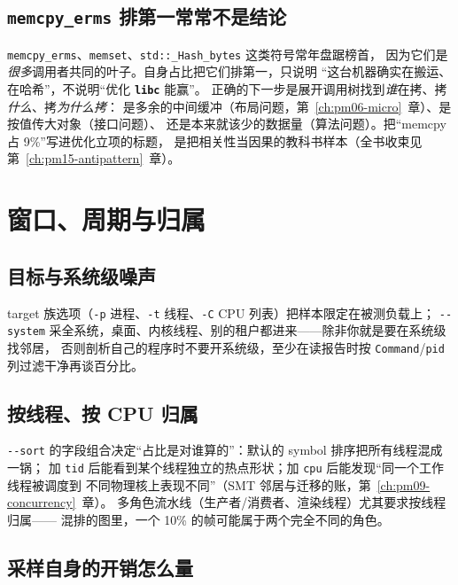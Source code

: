 \documentclass[12pt,a4paper,fontset=fandol]{ctexbook}
\newcommand{\Tp}[1]{\texttt{#1}}
\newcommand{\Opt}[1]{\texttt{-\/-#1}}
\newcommand{\Bk}{\discretionary{}{}{}}
\newcommand{\Lib}[1]{\textbf{\texttt{#1}}}
\begin{document}
\subsection{\Tp{memcpy\_erms} 排第一常常不是结论}

\begin{warning}[title={库顶帧效应：别和 \Lib{libc} 吵架}]
\Tp{memcpy\_erms}、\Tp{memset}、\Tp{std::{\Bk}\_Hash{\Bk}\_bytes} 这类符号常年盘踞榜首，
因为它们是\emph{很多}调用者共同的叶子。自身占比把它们排第一，只说明
``这台机器确实在搬运、在哈希''，不说明``优化 \Lib{libc} 能赢''。
正确的下一步是展开调用树找到\emph{谁}在拷、拷\emph{什么}、拷\emph{为什么拷}：
是多余的中间缓冲（布局问题，第~\ref{ch:pm06-micro}~章）、是按值传大对象（接口问题）、
还是本来就该少的数据量（算法问题）。把``memcpy 占 9\%''写进优化立项的标题，
是把相关性当因果的教科书样本（全书收束见第~\ref{ch:pm15-antipattern}~章）。
\end{warning}

\section{窗口、周期与归属}
\label{sec:pm04-window}

\subsection{目标与系统级噪声}

target 族选项（\Tp{-p} 进程、\Tp{-t} 线程、\Tp{-C} CPU 列表）把样本限定在被测负载上；
\Opt{system} 采全系统，桌面、内核线程、别的租户都进来——除非你就是要在系统级找邻居，
否则剖析自己的程序时不要开系统级，至少在读报告时按 \Tp{Command}/\Tp{pid} 列过滤干净再谈百分比。

\subsection{按线程、按 CPU 归属}

\Opt{sort} 的字段组合决定``占比是对谁算的''：默认的 symbol 排序把所有线程混成一锅；
加 \Tp{tid} 后能看到某个线程独立的热点形状；加 \Tp{cpu} 后能发现``同一个工作线程被调度到
不同物理核上表现不同''（SMT 邻居与迁移的账，第~\ref{ch:pm09-concurrency}~章）。
多角色流水线（生产者/消费者、渲染线程）尤其要求按线程归属——
混排的图里，一个 10\% 的帧可能属于两个完全不同的角色。

\subsection{采样自身的开销怎么量}
\end{document}
